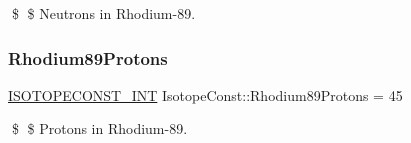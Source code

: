 \$ \$ Neutrons in Rhodium-\/89. \mbox{\label{group___isotope_const-_rhodium-_rh89_gad79c40cbd8231acfe2f0334d941d60ba}} 
\subsubsection{\texorpdfstring{Rhodium89\+Protons}{Rhodium89Protons}}
{\footnotesize\ttfamily \mbox{\hyperlink{group___isotope_const-_macros_ga5f18360b3e99483a35c32d789e62621c}{I\+S\+O\+T\+O\+P\+E\+C\+O\+N\+S\+T\+\_\+\+I\+NT}} Isotope\+Const\+::\+Rhodium89\+Protons = 45}

\$ \$ Protons in Rhodium-\/89. 